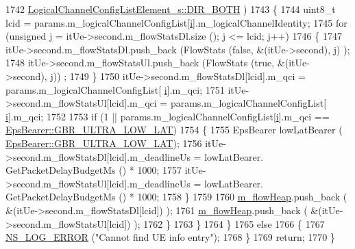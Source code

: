 \begin{DoxyCode}
1742                                 \hyperlink{structns3_1_1LogicalChannelConfigListElement__s_a0ce1e3a6af4d9a3e9fc19361d0af4e00abbf65338c16bef65cdedec87e8a7efaa}{LogicalChannelConfigListElement\_s::DIR\_BOTH}
      )
1743                 \{
1744                         uint8\_t lcid = params.m\_logicalChannelConfigList[\hyperlink{bernuolliDistribution_8m_a6f6ccfcf58b31cb6412107d9d5281426}{i}].m\_logicalChannelIdentity;
1745                         \textcolor{keywordflow}{for} (\textcolor{keywordtype}{unsigned} j = itUe->second.m\_flowStatsDl.size (); j <= lcid; j++)
1746                         \{
1747                                 itUe->second.m\_flowStatsDl.push\_back (FlowStats (\textcolor{keyword}{false}, &(itUe->second), j)
      );
1748                                 itUe->second.m\_flowStatsUl.push\_back (FlowStats (\textcolor{keyword}{true}, &(itUe->second), j))
      ;
1749                         \}
1750                         itUe->second.m\_flowStatsDl[lcid].m\_qci = params.m\_logicalChannelConfigList[
      \hyperlink{bernuolliDistribution_8m_a6f6ccfcf58b31cb6412107d9d5281426}{i}].m\_qci;
1751                         itUe->second.m\_flowStatsUl[lcid].m\_qci = params.m\_logicalChannelConfigList[
      \hyperlink{bernuolliDistribution_8m_a6f6ccfcf58b31cb6412107d9d5281426}{i}].m\_qci;
1752 
1753                         \textcolor{keywordflow}{if} (1 || params.m\_logicalChannelConfigList[\hyperlink{bernuolliDistribution_8m_a6f6ccfcf58b31cb6412107d9d5281426}{i}].m\_qci == 
      \hyperlink{structns3_1_1EpsBearer_aecf0c67109c5eb4ec0b07226fff5885ea1b3267491c7ea82ddc90b433c429c7c1}{EpsBearer::GBR\_ULTRA\_LOW\_LAT})
1754                         \{
1755                                 EpsBearer lowLatBearer (
      \hyperlink{structns3_1_1EpsBearer_aecf0c67109c5eb4ec0b07226fff5885ea1b3267491c7ea82ddc90b433c429c7c1}{EpsBearer::GBR\_ULTRA\_LOW\_LAT});
1756                                 itUe->second.m\_flowStatsDl[lcid].m\_deadlineUs = lowLatBearer.
      GetPacketDelayBudgetMs () * 1000;
1757                                 itUe->second.m\_flowStatsUl[lcid].m\_deadlineUs = lowLatBearer.
      GetPacketDelayBudgetMs () * 1000;
1758                         \}
1759 
1760                         \hyperlink{classns3_1_1MmWaveFlexTtiPfMacScheduler_a376eaf1c328d3a6b91d0b5c5bae16315}{m\_flowHeap}.push\_back ( &(itUe->second.m\_flowStatsDl[lcid]) );
1761                         \hyperlink{classns3_1_1MmWaveFlexTtiPfMacScheduler_a376eaf1c328d3a6b91d0b5c5bae16315}{m\_flowHeap}.push\_back ( &(itUe->second.m\_flowStatsUl[lcid]) );
1762                 \}
1763         \}
1764   \}
1765   \textcolor{keywordflow}{else}
1766   \{
1767         \hyperlink{group__logging_ga0261a8db1d4ac5f79417d117634fd455}{NS\_LOG\_ERROR} (\textcolor{stringliteral}{"Cannot find UE info entry"});
1768   \}
1769   \textcolor{keywordflow}{return};
1770 \}
\end{DoxyCode}


